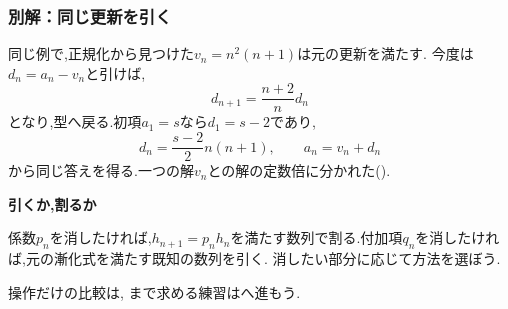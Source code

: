   \subsubsection{別解：同じ更新を引く}
  同じ例で,正規化から見つけた$v_n=n^2(n+1)$は元の更新を満たす.
  今度は$d_n=a_n-v_n$と引けば,
  \[
    d_{n+1}=\frac{n+2}{n}d_n
  \]
  となり,型へ戻る.初項$a_1=s$なら$d_1=s-2$であり,
  \[
    d_n=\frac{s-2}{2}n(n+1),\qquad a_n=v_n+d_n
  \]
  から同じ答えを得る.一つの解$v_n$との解の定数倍に分かれた().

  \begin{bookpoint}
    \textbf{引くか,割るか}\par
    係数$p_n$を消したければ,$h_{n+1}=p_nh_n$を満たす数列で割る.付加項$q_n$を消したければ,元の漸化式を満たす既知の数列を引く.
    消したい部分に応じて方法を選ぼう.
  \end{bookpoint}
  操作だけの比較は,
  まで求める練習はへ進もう.
